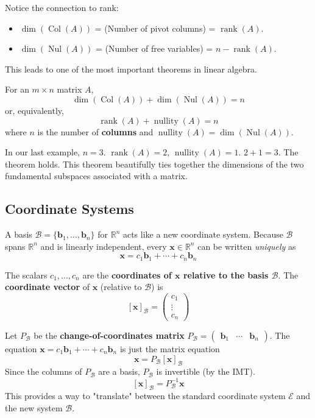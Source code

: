 Notice the connection to rank:
\begin{itemize}
    \item $\dim(\operatorname{Col}(A))$ = (Number of pivot columns) = $\operatorname{rank}(A)$.
    \item $\dim(\operatorname{Nul}(A))$ = (Number of free variables) = $n - \operatorname{rank}(A)$.
\end{itemize}
This leads to one of the most important theorems in linear algebra.

\begin{theorem}
For an $m \times n$ matrix $A$,
\[ \dim(\operatorname{Col}(A)) + \dim(\operatorname{Nul}(A)) = n \]
or, equivalently,
\[ \operatorname{rank}(A) + \operatorname{nullity}(A) = n \]
where $n$ is the number of \textbf{columns} and $\operatorname{nullity}(A) = \dim(\operatorname{Nul}(A))$.
\end{theorem}
In our last example, $n=3$. $\operatorname{rank}(A) = 2$, $\operatorname{nullity}(A) = 1$.
$2 + 1 = 3$. The theorem holds.
This theorem beautifully ties together the dimensions of the two fundamental subspaces associated with a matrix.

\subsection{Coordinate Systems}
A basis $\mathcal{B} = \{\mathbf{b}_1, \ldots, \mathbf{b}_n\}$ for $\mathbb{R}^n$ acts like a new coordinate system.
Because $\mathcal{B}$ spans $\mathbb{R}^n$ and is linearly independent, every $\mathbf{x} \in \mathbb{R}^n$ can be written \emph{uniquely} as
\[ \mathbf{x} = c_1\mathbf{b}_1 + \cdots + c_n\mathbf{b}_n \]
\begin{definition}
The scalars $c_1, \ldots, c_n$ are the \textbf{coordinates of $\mathbf{x}$ relative to the basis $\mathcal{B}$}.
The \textbf{coordinate vector} of $\mathbf{x}$ (relative to $\mathcal{B}$) is
\[ [\mathbf{x}]_{\mathcal{B}} = \begin{pmatrix} c_1 \\ \vdots \\ c_n \end{pmatrix} \]
\end{definition}

Let $P_{\mathcal{B}}$ be the \textbf{change-of-coordinates matrix} $P_{\mathcal{B}} = \begin{pmatrix} \mathbf{b}_1 & \cdots & \mathbf{b}_n \end{pmatrix}$.
The equation $\mathbf{x} = c_1\mathbf{b}_1 + \cdots + c_n\mathbf{b}_n$ is just the matrix equation
\[ \mathbf{x} = P_{\mathcal{B}} [\mathbf{x}]_{\mathcal{B}} \]
Since the columns of $P_{\mathcal{B}}$ are a basis, $P_{\mathcal{B}}$ is invertible (by the IMT).
\[ [\mathbf{x}]_{\mathcal{B}} = P_{\mathcal{B}}^{-1} \mathbf{x} \]
This provides a way to "translate" between the standard coordinate system $\mathcal{E}$ and the new system $\mathcal{B}$.

